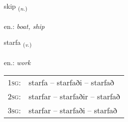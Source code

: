 \documentclass[frontgrid, backgrid]{flacards}\usepackage[]{graphicx}\usepackage[]{xcolor}
\begin{document}
{skip \small{\textsubscript{(\textit{n.})}} \\[1ex] %
\textphonetic{[scɪːp]} \\
en.: \emph{boat, ship} \\  [2ex]
\renewcommand*{\arraystretch}{0.8}
}

\renewcommand{\flhead}{\vskip5pt \fboxsep=0pt {\small\bfseries\footnotesize Sagnorð | Verb}}
\renewcommand{\fcfoot}{\vskip5pt \fboxsep=0pt \hspace{2pt}{\small\bfseries\footnotesize 1K}}

\renewcommand{\blhead}{\vskip5pt {\small\bfseries\footnotesize Sagnorð | Verb }}
\renewcommand{\bcfoot}{\vskip5pt \hspace{2pt}{\small\bfseries\footnotesize 1K}}


{starfa \small{\textsubscript{(\textit{v.})}} \\[1ex] %
\textphonetic{[starva]} \\
en.: \emph{work} \\  [2ex]
\renewcommand*{\arraystretch}{0.8}
\begin{tabular}{p{1cm}l}
\textsc{1sg}: & starfa -- starfaði -- starfað \\ 
\textsc{2sg}: & starfar -- starfaðir -- starfað \\ 
\textsc{3sg}: & starfar -- starfaði -- starfað \\ 
\end{tabular}
}

\renewcommand{\flhead}{\vskip5pt \fboxsep=0pt {\small\bfseries\footnotesize Nafnorð | Noun}}
\renewcommand{\fcfoot}{\vskip5pt \fboxsep=0pt \hspace{2pt}{\small\bfseries\footnotesize 1K}}
\end{document}
